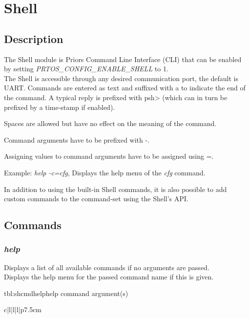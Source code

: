 \chapter{Shell}

\section{Description}
The Shell module is Priors Command Line Interface (CLI) that can be enabled by setting  \textit{PRTOS\_CONFIG\_ENABLE\_SHELL} to 1.\\
The Shell is accessible through any desired communication port, the default is UART. Commands are entered as text and suffixed with a  to indicate the end of the command. A typical reply is prefixed with psh> (which can in turn be prefixed by a time-stamp if enabled).
\begin{pditemize}
	\item Spaces are allowed but have no effect on the meaning of the command.
	\item Command arguments have to be prefixed with -.
	\item Assigning values to command arguments have to be assigned using =.
\end{pditemize} 
Example: \textit{help -c=cfg}, Displays the help menu of the \textit{cfg} command.

In addition to using the built-in Shell commands, it is also possible to add custom commands to the command-set using the Shell's API.


\section{Commands}

\subsection{\textit{help}}
 Displays a list of all available commands if no arguments are passed.\\
 Displays the help menu for the passed command name if this is given.

\begin{pdtable}{tbl:shcmdhelp}{help command argument(s)}
	\begin{pdtabular}{c|l|l|l|p{7.5cm}}
	\end{pdtabular}
\end{pdtable}


